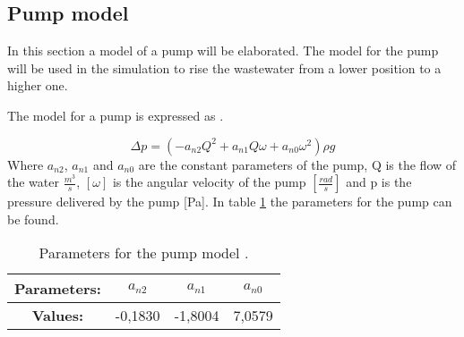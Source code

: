 \subsection{Pump model}\label{se:pump_model}
In this section a model of a pump will be elaborated. The model for the pump will be used in the simulation to rise the wastewater from a lower position to a higher one. 

 The model for a pump is expressed as \cite{kallesoe_pump}.

\begin{equation}\label{sec:eq_pump_exp}
\Delta p= (-a_{n2}Q^2+a_{n1}Q\omega+a_{n0}\omega^2)\rho g
\end{equation}
Where $a_{n2}$, $a_{n1}$ and $a_{n0}$ are the constant parameters of the pump, Q is the flow of the water $\frac{m^3}{s}$, $[\omega]$ is the angular velocity of the pump $[\frac{rad}{s}]$ and p is the pressure delivered by the pump [Pa]. In table \ref{tab:pump_parameters} the parameters for the pump can be found.
\begin{table}[H]
\centering
\begin{tabular}{|c|c|c|c|}
\hline
\rowcolor[HTML]{9B9B9B} 
\textbf{Parameters:}                     & \textbf{$a_{n2}$} & \textbf{$a_{n1}$} & \textbf{$a_{n0}$} \\ \hline
\cellcolor[HTML]{9B9B9B}\textbf{Values:} & -0,1830           & -1,8004            & 7,0579              \\ \hline
\end{tabular}
\caption{Parameters for the pump model \cite{kallesoe_pump}.}
\label{tab:pump_parameters}
\end{table}
